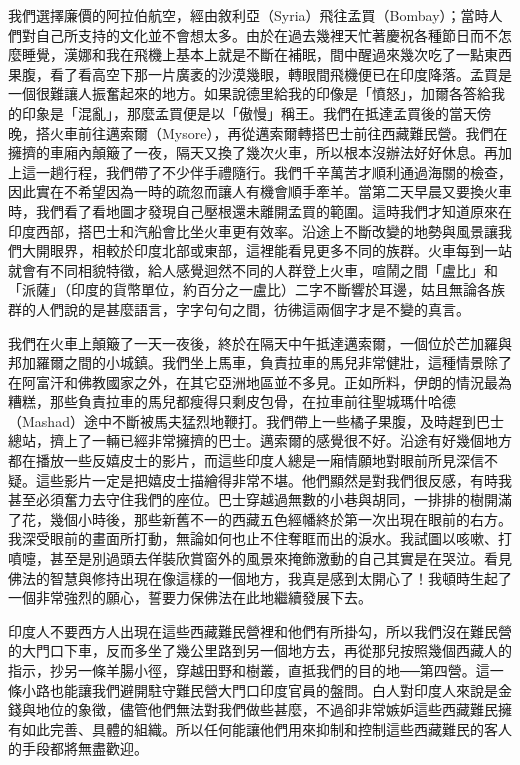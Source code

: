 我們選擇廉價的阿拉伯航空，經由敘利亞（Syria）飛往孟買（Bombay）；當時人們對自己所支持的文化並不會想太多。由於在過去幾裡天忙著慶祝各種節日而不怎麼睡覺，漢娜和我在飛機上基本上就是不斷在補眠，間中醒過來幾次吃了一點東西果腹，看了看高空下那一片廣袤的沙漠幾眼，轉眼間飛機便已在印度降落。孟買是一個很難讓人振奮起來的地方。如果說德里給我的印像是「憤怒」，加爾各答給我的印象是「混亂」，那麼孟買便是以「傲慢」稱王。我們在抵達孟買後的當天傍晚，搭火車前往邁索爾（Mysore），再從邁索爾轉搭巴士前往西藏難民營。我們在擁擠的車廂內顛簸了一夜，隔天又換了幾次火車，所以根本沒辦法好好休息。再加上這一趟行程，我們帶了不少伴手禮隨行。我們千辛萬苦才順利通過海關的檢查，因此實在不希望因為一時的疏忽而讓人有機會順手牽羊。當第二天早晨又要換火車時，我們看了看地圖才發現自己壓根還未離開孟買的範圍。這時我們才知道原來在印度西部，搭巴士和汽船會比坐火車更有效率。沿途上不斷改變的地勢與風景讓我們大開眼界，相較於印度北部或東部，這裡能看見更多不同的族群。火車每到一站就會有不同相貌特徵，給人感覺迴然不同的人群登上火車，喧鬧之間「盧比」和「派薩」（印度的貨幣單位，約百分之一盧比）二字不斷響於耳邊，姑且無論各族群的人們說的是甚麼語言，字字句句之間，彷彿這兩個字才是不變的真言。

我們在火車上顛簸了一天一夜後，終於在隔天中午抵達邁索爾，一個位於芒加羅與邦加羅爾之間的小城鎮。我們坐上馬車，負責拉車的馬兒非常健壯，這種情景除了在阿富汗和佛教國家之外，在其它亞洲地區並不多見。正如所料，伊朗的情況最為糟糕，那些負責拉車的馬兒都瘦得只剩皮包骨，在拉車前往聖城瑪什哈德（Mashad）途中不斷被馬夫猛烈地鞭打。我們帶上一些橘子果腹，及時趕到巴士總站，擠上了一輛已經非常擁擠的巴士。邁索爾的感覺很不好。沿途有好幾個地方都在播放一些反嬉皮士的影片，而這些印度人總是一廂情願地對眼前所見深信不疑。這些影片一定是把嬉皮士描繪得非常不堪。他們顯然是對我們很反感，有時我甚至必須奮力去守住我們的座位。巴士穿越過無數的小巷與胡同，一排排的樹開滿了花，幾個小時後，那些新舊不一的西藏五色經幡終於第一次出現在眼前的右方。我深受眼前的畫面所打動，無論如何也止不住奪眶而出的淚水。我試圖以咳嗽、打噴嚏，甚至是別過頭去佯裝欣賞窗外的風景來掩飾激動的自己其實是在哭泣。看見佛法的智慧與修持出現在像這樣的一個地方，我真是感到太開心了！我頓時生起了一個非常強烈的願心，誓要力保佛法在此地繼續發展下去。

印度人不要西方人出現在這些西藏難民營裡和他們有所掛勾，所以我們沒在難民營的大門口下車，反而多坐了幾公里路到另一個地方去，再從那兒按照幾個西藏人的指示，抄另一條羊腸小徑，穿越田野和樹叢，直抵我們的目的地──第四營。這一條小路也能讓我們避開駐守難民營大門口印度官員的盤問。白人對印度人來說是金錢與地位的象徵，儘管他們無法對我們做些甚麼，不過卻非常嫉妒這些西藏難民擁有如此完善、具體的組織。所以任何能讓他們用來抑制和控制這些西藏難民的客人的手段都將無盡歡迎。


